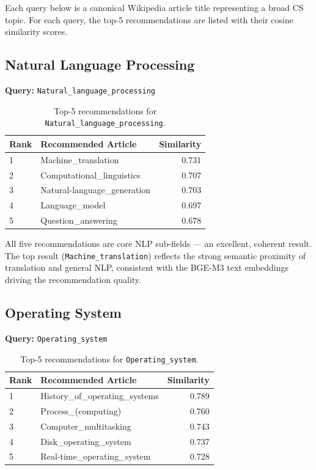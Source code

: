 \documentclass[12pt,a4paper]{article}
\begin{document}
Each query below is a canonical Wikipedia article title representing a broad
CS topic.  For each query, the top-5 recommendations are listed with their
cosine similarity scores.

\subsection{Natural Language Processing}

\textbf{Query:} \texttt{Natural\_language\_processing}

\begin{table}[H]
\centering
\caption{Top-5 recommendations for \texttt{Natural\_language\_processing}.}
\label{tab:nlp}
\begin{tabular}{llr}
\toprule
\textbf{Rank} & \textbf{Recommended Article} & \textbf{Similarity} \\
\midrule
1 & Machine\_translation & 0.731 \\
2 & Computational\_linguistics & 0.707 \\
3 & Natural-language\_generation & 0.703 \\
4 & Language\_model & 0.697 \\
5 & Question\_answering & 0.678 \\
\bottomrule
\end{tabular}
\end{table}

All five recommendations are core NLP sub-fields --- an excellent, coherent
result.  The top result (\texttt{Machine\_translation}) reflects the strong
semantic proximity of translation and general NLP, consistent with the BGE-M3
text embeddings driving the recommendation quality.

\subsection{Operating System}

\textbf{Query:} \texttt{Operating\_system}

\begin{table}[H]
\centering
\caption{Top-5 recommendations for \texttt{Operating\_system}.}
\label{tab:os}
\begin{tabular}{llr}
\toprule
\textbf{Rank} & \textbf{Recommended Article} & \textbf{Similarity} \\
\midrule
1 & History\_of\_operating\_systems & 0.789 \\
2 & Process\_(computing) & 0.760 \\
3 & Computer\_multitasking & 0.743 \\
4 & Disk\_operating\_system & 0.737 \\
5 & Real-time\_operating\_system & 0.728 \\
\bottomrule
\end{tabular}
\end{table}
\end{document}
